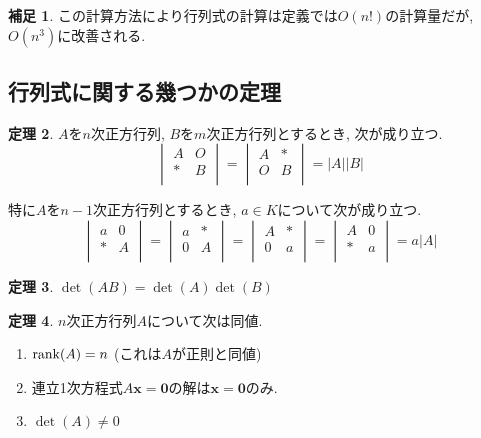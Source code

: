 \documentclass[dvipdfmx,a4paper,11pt]{article} %
\theoremstyle{definition}
\newtheorem{thm}{定理}
\newtheorem{rem}[thm]{補足}
\begin{document}
 \begin{rem}
 この計算方法により行列式の計算は定義では$O(n!)$の計算量だが, $O(n^3)$に改善される. 
 \end{rem}



\subsection{行列式に関する幾つかの定理 \cite[3.3節]{O}}

\begin{thm}\cite[定理 3.3.1-2]{O}
$A$を$n$次正方行列, $B$を$m$次正方行列とするとき, 次が成り立つ.
  $$
  \begin{vmatrix}
A & O\\
\ast &   B\\
\end{vmatrix}
=
  \begin{vmatrix}
A & \ast \\
O &   B\\
\end{vmatrix}
=|A| |B|
$$

特に$A$を$n-1$次正方行列とするとき, $a \in K$について次が成り立つ.
  $$
  \begin{vmatrix}
a & 0\\
\ast &   A\\
\end{vmatrix}
=
  \begin{vmatrix}
a & \ast \\
0 &   A\\
\end{vmatrix}
=
  \begin{vmatrix}
A & \ast \\
0 &   a\\
\end{vmatrix}
=
  \begin{vmatrix}
A & 0 \\
\ast &   a\\
\end{vmatrix}
=a |A|
$$
  \end{thm}

\begin{thm}\cite[定理 3.3.4]{O}
$\det(AB)=\det(A) \det(B)$
\end{thm}

\begin{thm}\cite[定理 3.3.5]{O}
\label{thm-regular-3}
$n$次正方行列$A$について次は同値.
\begin{enumerate}
\item ${\rm rank}(A)=n$ (これは$A$が正則と同値)
\item 連立1次方程式$A \bm{x}=\bm{0}$の解は$\bm{x}=\bm{0}$のみ. 
\item $\det(A)\neq 0$
\end{enumerate}
\end{thm}
\end{document}
